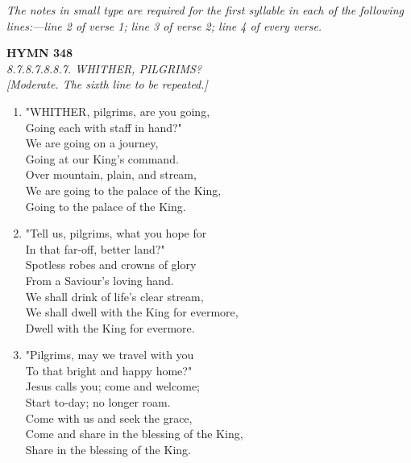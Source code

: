 \documentclass[11pt,a4paper]{article}
\begin{document}
\vspace{1em}
\noindent \textit{The notes in small type are required for the first syllable in each of the following lines:---line 2 of verse 1; line 3 of verse 2; line 4 of every verse.}

\newpage
\begin{center}
    {\Large \textbf{HYMN 348}}
    \\
    \textit{8.7.8.7.8.8.7. WHITHER, PILGRIMS?}
    \\
    \textit{\small [Moderate. The sixth line to be repeated.]}
\end{center}
\vspace{1em}

\begin{enumerate}
    \item "WHITHER, pilgrims, are you going, \\
        Going each with staff in hand?" \\
        We are going on a journey, \\
        Going at our King's command. \\
        Over mountain, plain, and stream, \\
        We are going to the palace of the King, \\
        Going to the palace of the King.

    \item "Tell us, pilgrims, what you hope for \\
        In that far-off, better land?" \\
        Spotless robes and crowns of glory \\
        From a Saviour's loving hand. \\
        We shall drink of life's clear stream, \\
        We shall dwell with the King for evermore, \\
        Dwell with the King for evermore.

    \item "Pilgrims, may we travel with you \\
        To that bright and happy home?" \\
        Jesus calls you; come and welcome; \\
        Start to-day; no longer roam. \\
        Come with us and seek the grace, \\
        Come and share in the blessing of the King, \\
        Share in the blessing of the King.

\end{enumerate}
\end{document}
